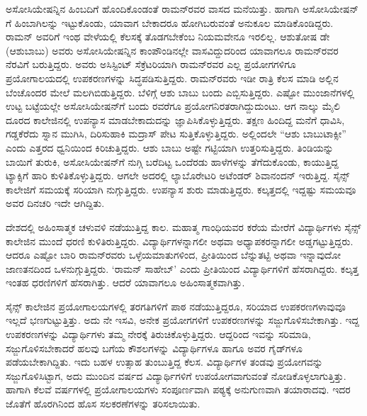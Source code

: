 ಅಸೋಸಿಯೇಷನ್ನಿನ ಹಿಂಬದಿಗೆ ಹೊಂದಿಕೊಂಡಂತೆ ರಾಮನ್‍ರವರ ವಾಸದ ಮನೆಯಿತ್ತು. ಹಾಗಾಗಿ ಅಸೋಸಿಯೇಷನ್ ಗೆ ಹಿಂಬಾಗಿಲನ್ನು ಇಟ್ಟುಕೊಂಡು, ಯಾವಾಗ ಬೇಕಾದರೂ ಹೋಗಿ\-ಬರುವಂತೆ ಅನುಕೂಲ ಮಾಡಿಕೊಂಡಿದ್ದರು. ರಾಮನ್ ಅವರಿಗೆ ಇಂಥ ವೇಳೆಯಲ್ಲಿ ಕೆಲಸಕ್ಕೆ ತೊಡಗಬೇಕೆಂಬ ನಿಯಮವೇನೂ ಇರಲಿಲ್ಲ. ಆಶುತೋಷ ಡೇ (ಆಶುಬಾಬು) ಅವರು ಅಸೋಸಿಯೇಷನ್ನಿನ ಕಾಂಪೌಂಡಿನಲ್ಲೇ ವಾಸವಿದ್ದುದರಿಂದ ಯಾವಾಗಲೂ ರಾಮನ್‍ರವರ ನೆರವಿಗೆ ಬರುತ್ತಿದ್ದರು. ಅವರು ಅಸಿಸ್ಟಿಂಟ್ ಸೆಕ್ರೆಟರಿಯಾಗಿ ರಾಮನ್‍ರವರ ಎಲ್ಲ ಪ್ರಯೋಗಗಳಿಗೂ ಪ್ರಯೋಗಾಲಯದಲ್ಲಿ ಉಪ\-ಕರಣಗಳನ್ನು ಸಿದ್ಧಪಡಿಸುತ್ತಿದ್ದರು. ರಾಮನ್‍ರವರು ಇಡೀ ರಾತ್ರಿ ಕೆಲಸ ಮಾಡಿ ಅಲ್ಲಿನ ಬೆಂಚೊಂದರ ಮೇಲೆ ಮಲಗಿಬಿಡುತ್ತಿದ್ದರು. ಬೆಳಿಗ್ಗೆ ಆಶು ಬಾಬು ಬಂದು ಎಬ್ಬಿಸುತ್ತಿದ್ದರು. ಎಷ್ಟೋ ಮುಂಜಾನೆಗಳಲ್ಲಿ ಉಟ್ಟ ಬಟ್ಟೆಯಲ್ಲೇ ಅಸೋಸಿಯೇಷನ್‍ಗೆ ಬಂದು  ರವರೆಗೂ ಪ್ರಯೋಗನಿರತರಾಗಿದ್ದುದುಂಟು. ಆಗ ನಾಲ್ಕು ಮೈಲಿ ದೂರದ ಕಾಲೇಜಿನಲ್ಲಿ ಉಪನ್ಯಾಸ ಮಾಡಬೇಕಾದುದನ್ನು ಜ್ಞಾಪಿಸಿಕೊಳ್ಳುತ್ತಿದ್ದರು. ತಕ್ಷಣ ಹಿಂದಿದ್ದ ಮನೆಗೆ ಧಾವಿಸಿ, ಗಡ್ಡಕೆರೆದು ಸ್ನಾನ ಮುಗಿಸಿ, ದಿರಿಸುಹಾಕಿ ಮದ್ರಾಸ್ ಪೇಟ ಸುತ್ತಿಕೊಳ್ಳುತ್ತಿದ್ದರು. ಅಲ್ಲಿಂದಲೇ “ಆಶು ಬಾಬು\enginline{-}ಟಾಕ್ಸೀ” ಎಂದು ಎತ್ತರದ ಧ್ವನಿಯಿಂದ ಕಿರಿಚುತ್ತಿದ್ದರು. ಆಶು ಬಾಬು ಅಷ್ಟೇ ಗಟ್ಟಿಯಾಗಿ ಉತ್ತರಿಸುತ್ತಿದ್ದರು. ತಿಂಡಿಯನ್ನು ಬಾಯಿಗೆ ತುರುಕಿ, ಅಸೋಸಿಯೇಷನ್‍ಗೆ ನುಗ್ಗಿ ಬರೆದಿಟ್ಟ ಒಂದೆರಡು ಹಾಳೆಗಳನ್ನು ತೆಗೆದುಕೊಂಡು, ಕಾಯುತ್ತಿದ್ದ ಟ್ಯಾಕ್ಸಿಗೆ ಹಾರಿ ಕುಳಿತಿಕೊಳ್ಳುತ್ತಿದ್ದರು. ಆಗಲೇ ಅದರಲ್ಲಿ ಲ್ಯಾಬೊರೇಟರಿ ಅಟೆಂಡರ್ ಶಿವಾನಂದನ್ ಇರುತ್ತಿದ್ದ. ಸೈನ್ಸ್ ಕಾಲೇಜಿಗೆ ಸಮಯಕ್ಕೆ ಸರಿಯಾಗಿ ನುಗ್ಗುತ್ತಿದ್ದರು. ಉಪನ್ಯಾಸ ಶುರು ಮಾಡುತ್ತಿದ್ದರು. ಕಲ್ಕತ್ತದಲ್ಲಿ ಇದ್ದಷ್ಟು ಸಮಯವೂ ಅವರ ದಿನಚರಿ ಇದೇ ಆಗಿದ್ದಿತು.

ದೇಶದಲ್ಲಿ ಅಹಿಂಸಾತ್ಮಕ ಚಳುವಳಿ ನಡೆಯುತ್ತಿದ್ದ ಕಾಲ. ಮಹಾತ್ಮ ಗಾಂಧಿಯವರ ಕರೆಯ ಮೇರೆಗೆ ವಿದ್ಯಾರ್ಥಿಗಳು ಸೈನ್ಸ್ ಕಾಲೇಜಿನ ಮುಂದೆ ಧರಣಿ ಕುಳಿತಿರುತ್ತಿದ್ದರು. ವಿದ್ಯಾರ್ಥಿಗಳನ್ನಾಗಲೀ ಅಥವಾ ಅಧ್ಯಾಪಕರನ್ನಾಗಲೀ ಅಡ್ಡಗಟ್ಟುತ್ತಿದ್ದರು. ಆದರೂ ಎಷ್ಟೋ ಬಾರಿ ರಾಮನ್‍ರವರು ಒಳ್ಳೆಯಮಾತುಗಳಿಂದ, ಪ್ರೀತಿಯಿಂದ ಬೆನ್ನುತಟ್ಟಿ ಅಥವಾ ಇನ್ನಾವುದೋ ಜಾಣತನದಿಂದ ಒಳನುಗ್ಗುತ್ತಿದ್ದರು. ‘ರಾಮನ್ ಸಾಹೇಬ್’ ಎಂದು ಪ್ರೀತಿಯಿಂದ ವಿದ್ಯಾರ್ಥಿಗಳಿಗೆ ಹೆಸರಾಗಿದ್ದರು. ಕಲ್ಕತ್ತ ಇಂತಹ ಧರಣಿಗಳಿಗೆ ಹೆಸರಾಗಿತ್ತು. ಆದರೆ ಯಾವಾಗಲೂ ಅಹಿಂಸಾತ್ಮಕವಾಗಿತ್ತು. 

ಸೈನ್ಸ್ ಕಾಲೇಜಿನ ಪ್ರಯೋಗಾಲಯಗಳಲ್ಲಿ ತರಗತಿಗಳಿಗೆ ಪಾಠ ನಡೆಯುತ್ತಿದ್ದರೂ, ಸರಿಯಾದ ಉಪಕರಣಗಳಾವುವೂ ಇಲ್ಲದೆ ಭಣಗುಟ್ಟುತ್ತಿತ್ತು. ಅದು ನೇ ಇಸವಿ, ಅನೇಕ ಪ್ರಯೋಗಗಳಿಗೆ ಉಪಕರಣಗಳನ್ನು ಸಜ್ಜುಗೊಳಿಸಬೇಕಾಗಿತ್ತು. ಇದ್ದ ಉಪಕರಣಗಳನ್ನು ವಿದ್ಯಾರ್ಥಿಗಳು ತಮ್ಮ ನೇರಕ್ಕೆ ತಿರುಚಿಕೊಳ್ಳುತ್ತಿದ್ದರು. ಆದ್ದರಿಂದ ಇವನ್ನು ಸರಿಮಾಡಿ, ಸಜ್ಜುಗೊಳಿಸಬೇಕಾದರೆ ಹಲವು ಬಗೆಯ ಕೌಶಲಗಳನ್ನು ವಿದ್ಯಾರ್ಥಿಗಳೂ ಹಾಗೂ ಅವರ ಗೈಡ್‍ಗಳೂ ಪಡೆಯಬೇಕಾಗಿದ್ದಿತು. ಇದು ಬಹಳ ಉತ್ಸಾಹ ತುಂಬುತ್ತಿದ್ದ ಕೆಲಸ. ವಿದ್ಯಾರ್ಥಿಗಳ ತಂಡವು ಪ್ರಯೋಗವನ್ನು ಸಜ್ಜುಗೊಳಿಸಿಟ್ಟಾಗ, ಅದು ಮುಂದಿನ ವರ್ಷದ ವಿದ್ಯಾರ್ಥಿಗಳಿಗೆ ಉಪಯೋಗವಾಗುವಂತೆ ನೋಡಿಕೊಳ್ಳಲಾಗುತ್ತಿತ್ತು. ಹಾಗಾಗಿ ಕೆಲವೆ ವರ್ಷಗಳಲ್ಲಿ ಪ್ರಯೋಗಾಲಯಗಳು ಸಂಪೂರ್ಣವಾಗಿ  ಪಠ್ಯಕ್ಕೆ ಅನುಗುಣವಾಗಿ ತಯಾರಾದವು. ಇದರ ಜೊತೆಗೆ ಹೊರಗಿನಿಂದ ಹೊಸ ಸಲಕರಣೆಗಳನ್ನು ತರಿಸಲಾಯಿತು.



